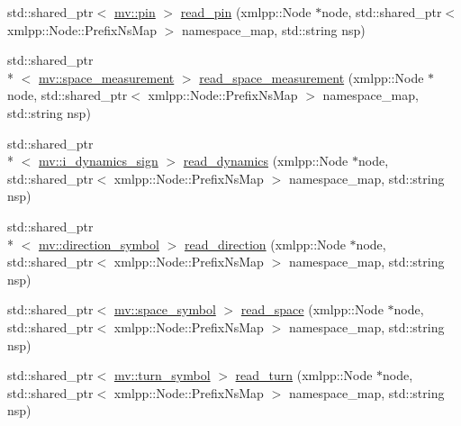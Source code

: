 \begin{DoxyCompactItemize}
\item 
std\-::shared\-\_\-ptr$<$ \hyperlink{classmae_1_1fl_1_1laban_1_1mv_1_1pin}{mv\-::pin} $>$ \hyperlink{classmae_1_1fl_1_1laban_1_1internal__laban__sequence__reader_a872f91c7297e96169e541c2c4d5fc395}{read\-\_\-pin} (xmlpp\-::\-Node $\ast$node, std\-::shared\-\_\-ptr$<$ xmlpp\-::\-Node\-::\-Prefix\-Ns\-Map $>$ namespace\-\_\-map, std\-::string nsp)
\item 
std\-::shared\-\_\-ptr\\*
$<$ \hyperlink{classmae_1_1fl_1_1laban_1_1mv_1_1space__measurement}{mv\-::space\-\_\-measurement} $>$ \hyperlink{classmae_1_1fl_1_1laban_1_1internal__laban__sequence__reader_a511392ff483d1fa2665c2d22e9c80e78}{read\-\_\-space\-\_\-measurement} (xmlpp\-::\-Node $\ast$node, std\-::shared\-\_\-ptr$<$ xmlpp\-::\-Node\-::\-Prefix\-Ns\-Map $>$ namespace\-\_\-map, std\-::string nsp)
\item 
std\-::shared\-\_\-ptr\\*
$<$ \hyperlink{classmae_1_1fl_1_1laban_1_1mv_1_1i__dynamics__sign}{mv\-::i\-\_\-dynamics\-\_\-sign} $>$ \hyperlink{classmae_1_1fl_1_1laban_1_1internal__laban__sequence__reader_a03aebd3b6d9bb0d7f8dd26aa547b73dd}{read\-\_\-dynamics} (xmlpp\-::\-Node $\ast$node, std\-::shared\-\_\-ptr$<$ xmlpp\-::\-Node\-::\-Prefix\-Ns\-Map $>$ namespace\-\_\-map, std\-::string nsp)
\item 
std\-::shared\-\_\-ptr\\*
$<$ \hyperlink{classmae_1_1fl_1_1laban_1_1mv_1_1direction__symbol}{mv\-::direction\-\_\-symbol} $>$ \hyperlink{classmae_1_1fl_1_1laban_1_1internal__laban__sequence__reader_a259a3e82b460aa9f7e81f03b6823d864}{read\-\_\-direction} (xmlpp\-::\-Node $\ast$node, std\-::shared\-\_\-ptr$<$ xmlpp\-::\-Node\-::\-Prefix\-Ns\-Map $>$ namespace\-\_\-map, std\-::string nsp)
\item 
std\-::shared\-\_\-ptr$<$ \hyperlink{classmae_1_1fl_1_1laban_1_1mv_1_1space__symbol}{mv\-::space\-\_\-symbol} $>$ \hyperlink{classmae_1_1fl_1_1laban_1_1internal__laban__sequence__reader_a7584516620d3cd59d3e4441e82103318}{read\-\_\-space} (xmlpp\-::\-Node $\ast$node, std\-::shared\-\_\-ptr$<$ xmlpp\-::\-Node\-::\-Prefix\-Ns\-Map $>$ namespace\-\_\-map, std\-::string nsp)
\item 
std\-::shared\-\_\-ptr$<$ \hyperlink{classmae_1_1fl_1_1laban_1_1mv_1_1turn__symbol}{mv\-::turn\-\_\-symbol} $>$ \hyperlink{classmae_1_1fl_1_1laban_1_1internal__laban__sequence__reader_a7caa2b98e906aa54eb51bee955cf5917}{read\-\_\-turn} (xmlpp\-::\-Node $\ast$node, std\-::shared\-\_\-ptr$<$ xmlpp\-::\-Node\-::\-Prefix\-Ns\-Map $>$ namespace\-\_\-map, std\-::string nsp)

\end{DoxyCompactItemize}
